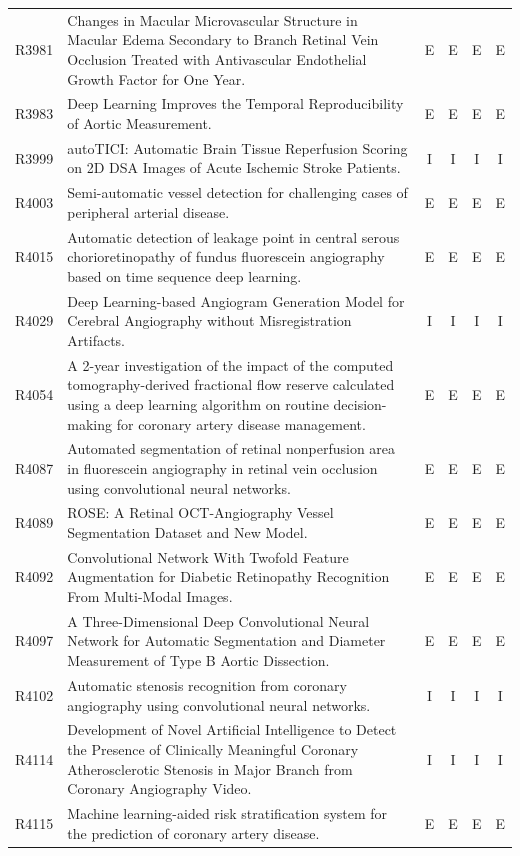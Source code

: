 \begin{longtable}{@{}l p{8.6cm} c c c c@{}}
R3981 & Changes in Macular Microvascular Structure in Macular Edema Secondary to Branch Retinal Vein Occlusion Treated with Antivascular Endothelial Growth Factor for One Year. & E & E & E & E \\
R3983 & Deep Learning Improves the Temporal Reproducibility of Aortic Measurement. & E & E & E & E \\
R3999 & autoTICI: Automatic Brain Tissue Reperfusion Scoring on 2D DSA Images of Acute Ischemic Stroke Patients. & I & I & I & I \\
R4003 & Semi-automatic vessel detection for challenging cases of peripheral arterial disease. & E & E & E & E \\
R4015 & Automatic detection of leakage point in central serous chorioretinopathy of fundus fluorescein angiography based on time sequence deep learning. & E & E & E & E \\
R4029 & Deep Learning-based Angiogram Generation Model for Cerebral Angiography without Misregistration Artifacts. & I & I & I & I \\
R4054 & A 2-year investigation of the impact of the computed tomography-derived fractional flow reserve calculated using a deep learning algorithm on routine decision-making for coronary artery disease management. & E & E & E & E \\
R4087 & Automated segmentation of retinal nonperfusion area in fluorescein angiography in retinal vein occlusion using convolutional neural networks. & E & E & E & E \\
R4089 & ROSE: A Retinal OCT-Angiography Vessel Segmentation Dataset and New Model. & E & E & E & E \\
R4092 & Convolutional Network With Twofold Feature Augmentation for Diabetic Retinopathy Recognition From Multi-Modal Images. & E & E & E & E \\
R4097 & A Three-Dimensional Deep Convolutional Neural Network for Automatic Segmentation and Diameter Measurement of Type B Aortic Dissection. & E & E & E & E \\
R4102 & Automatic stenosis recognition from coronary angiography using convolutional neural networks. & I & I & I & I \\
R4114 & Development of Novel Artificial Intelligence to Detect the Presence of Clinically Meaningful Coronary Atherosclerotic Stenosis in Major Branch from Coronary Angiography Video. & I & I & I & I \\
R4115 & Machine learning-aided risk stratification system for the prediction of coronary artery disease. & E & E & E & E \\

\end{longtable}
